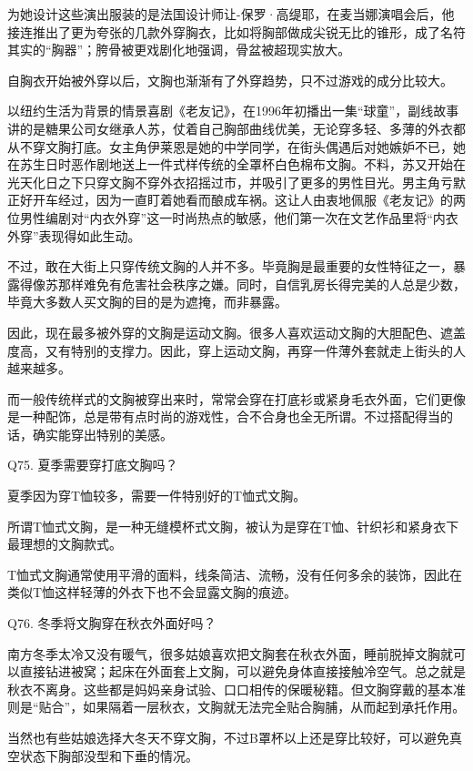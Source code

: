\documentclass[12pt,UTF8]{ctexbook}
\begin{document}
为她设计这些演出服装的是法国设计师让-保罗·高缇耶，在麦当娜演唱会后，他接连推出了更为夸张的几款外穿胸衣，比如将胸部做成尖锐无比的锥形，成了名符其实的“胸器”；胯骨被更戏剧化地强调，骨盆被超现实放大。

自胸衣开始被外穿以后，文胸也渐渐有了外穿趋势，只不过游戏的成分比较大。

以纽约生活为背景的情景喜剧《老友记》，在1996年初播出一集“球童”，副线故事讲的是糖果公司女继承人苏，仗着自己胸部曲线优美，无论穿多轻、多薄的外衣都从不穿文胸打底。女主角伊莱恩是她的中学同学，在街头偶遇后对她嫉妒不已，她在苏生日时恶作剧地送上一件式样传统的全罩杯白色棉布文胸。不料，苏又开始在光天化日之下只穿文胸不穿外衣招摇过市，并吸引了更多的男性目光。男主角亏默正好开车经过，因为一直盯着她看而酿成车祸。这让人由衷地佩服《老友记》的两位男性编剧对“内衣外穿”这一时尚热点的敏感，他们第一次在文艺作品里将“内衣外穿”表现得如此生动。


不过，敢在大街上只穿传统文胸的人并不多。毕竟胸是最重要的女性特征之一，暴露得像苏那样难免有危害社会秩序之嫌。同时，自信乳房长得完美的人总是少数，毕竟大多数人买文胸的目的是为遮掩，而非暴露。

因此，现在最多被外穿的文胸是运动文胸。很多人喜欢运动文胸的大胆配色、遮盖度高，又有特别的支撑力。因此，穿上运动文胸，再穿一件薄外套就走上街头的人越来越多。

而一般传统样式的文胸被穿出来时，常常会穿在打底衫或紧身毛衣外面，它们更像是一种配饰，总是带有点时尚的游戏性，合不合身也全无所谓。不过搭配得当的话，确实能穿出特别的美感。





Q75. 夏季需要穿打底文胸吗？


夏季因为穿T恤较多，需要一件特别好的T恤式文胸。

所谓T恤式文胸，是一种无缝模杯式文胸，被认为是穿在T恤、针织衫和紧身衣下最理想的文胸款式。

T恤式文胸通常使用平滑的面料，线条简洁、流畅，没有任何多余的装饰，因此在类似T恤这样轻薄的外衣下也不会显露文胸的痕迹。





Q76. 冬季将文胸穿在秋衣外面好吗？


南方冬季太冷又没有暖气，很多姑娘喜欢把文胸套在秋衣外面，睡前脱掉文胸就可以直接钻进被窝；起床在外面套上文胸，可以避免身体直接接触冷空气。总之就是秋衣不离身。这些都是妈妈亲身试验、口口相传的保暖秘籍。但文胸穿戴的基本准则是“贴合”，如果隔着一层秋衣，文胸就无法完全贴合胸脯，从而起到承托作用。

当然也有些姑娘选择大冬天不穿文胸，不过B罩杯以上还是穿比较好，可以避免真空状态下胸部没型和下垂的情况。
\end{document}
